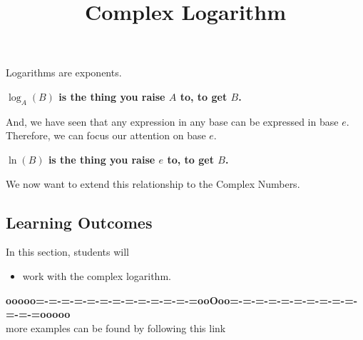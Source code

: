 \documentclass{ximera}
\title{Complex Logarithm}
\begin{document}
\begin{abstract}
%
\end{abstract}
\maketitle






Logarithms are exponents.

\begin{center}
\textbf{\textcolor{red!80!black}{$\log_A(B)$ is the thing you raise $A$ to, to get $B$.}}
\end{center}


And, we have seen that any expression in any base can be expressed in base $e$. Therefore, we can focus our attention on base $e$.



\begin{center}
\textbf{\textcolor{red!80!black}{$\ln(B)$ is the thing you raise $e$ to, to get $B$.}}
\end{center}





We now want to extend this relationship to the Complex Numbers.







\subsection{Learning Outcomes}

\begin{sectionOutcomes}
In this section, students will 

\begin{itemize}
\item work with the complex logarithm.
\end{itemize}
\end{sectionOutcomes}
















\begin{center}
\textbf{\textcolor{green!50!black}{ooooo=-=-=-=-=-=-=-=-=-=-=-=-=ooOoo=-=-=-=-=-=-=-=-=-=-=-=-=ooooo}} \\

more examples can be found by following this link\\ 

\end{center}
\end{document}
